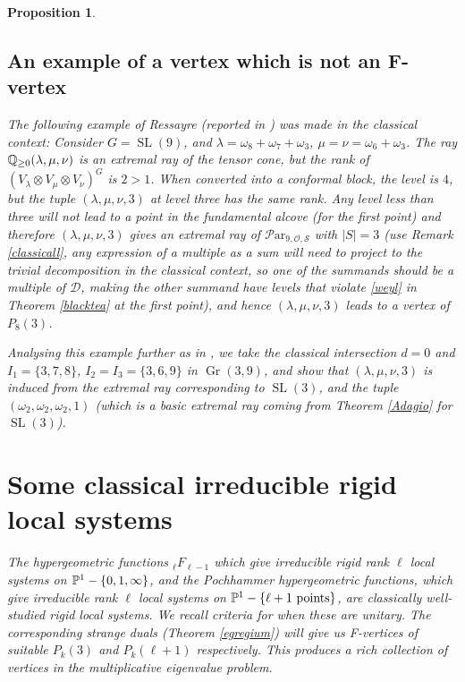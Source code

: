 \documentclass[11pt]{amsart}
\newcommand\op{\operatorname}
\newcommand\tensor{\otimes}
\newcommand\Par{\mathcal{P}\text{ar} }
\newcommand\Gr{\operatorname{Gr}}
\newtheorem{proposition}[theorem]{Proposition}
\numberwithin{theorem}{subsection}
\begin{document}
{\begin{proposition}
\subsection{An example of a vertex which is not an F-vertex}\label{Rex}
The following example of Ressayre (reported in \cite[Section 10.5]{BHermit}) was made in the classical context:
Consider $G=\op{SL}(9)$, and  $\lambda=\omega_8+\omega_7+\omega_3$, $\mu=\nu=\omega_6+\omega_3$. The ray $\Bbb{Q}_{\ge 0}(\lambda,\mu,\nu)$ is an extremal ray of the tensor cone, but the rank of $(V_{\lambda}\tensor V_{\mu}\tensor V_{\nu})^G$ is $2>1$. When converted into a conformal block, the level is $4$, but the tuple $(\lambda,\mu,\nu,3)$ at level three has the same rank. Any level less than three will not
lead to a point in the fundamental alcove (for the first point) and therefore $(\lambda,\mu,\nu,3)$ gives an extremal ray of $\Par_{9,\mathcal{O,S}}$ with $|S|=3$ (use Remark \ref{classicall}, any expression of a multiple as a sum will need to project to the trivial decomposition in the classical context, so one of the summands should be a multiple of $\mathcal{D}$, making the other summand have levels that violate \eqref{weyl} in Theorem \ref{blacktea} at the first point),  and hence $(\lambda,\mu,\nu,3)$ leads to a vertex of $P_8(3)$.

Analysing this example further as in \cite[Section 10.5]{BHermit}, we take the classical intersection $d=0$ and $I_1=\{3,7,8\}$, $I_2=I_3=\{3,6,9\}$ in $\Gr(3,9)$, and show that $(\lambda,\mu,\nu,3)$ is induced from the extremal ray corresponding to $\op{SL}(3)$, and the tuple $(\omega_2,\omega_2,\omega_2,1)$ (which is a basic extremal ray  coming from Theorem \ref{Adagio} for $\op{SL}(3)$).

\section{Some classical irreducible rigid local systems}\label{classH}
The hypergeometric functions ${}_{\ell}F_{\ell-1}$ which give irreducible rigid rank $\ell$ local systems on $\Bbb{P}^1-\{0,1,\infty\}$, and the Pochhammer hypergeometric functions, which give irreducible rank $\ell$ local systems on $\Bbb{P}^1-\{\ell+1\text{ points}\}$, are classically well-studied rigid local systems. We recall \cite{BH, Haraoka} criteria for when these are unitary. The corresponding strange duals (Theorem \ref{egregium}) will give us F-vertices of suitable $P_k(3)$ and $P_k(\ell+1)$ respectively. This produces a rich collection of vertices in the multiplicative eigenvalue problem.

\end{proposition}}
\end{document}
